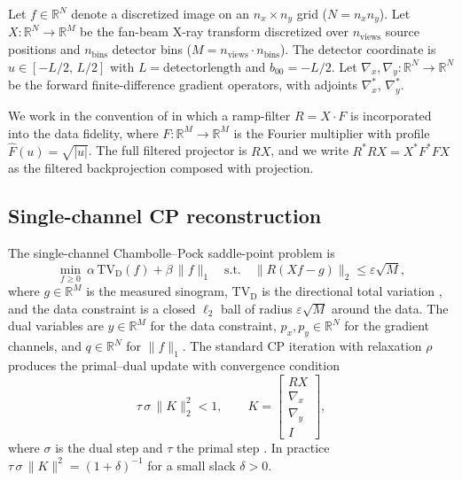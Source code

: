 \documentclass{article}
\newcommand{\R}{\mathbb{R}}
\newcommand{\eps}{\varepsilon}
\begin{document}
Let $f \in \R^{N}$ denote a discretized image on an $n_x \times n_y$
grid ($N = n_x n_y$). Let $X : \R^N \to \R^M$ be the fan-beam X-ray
transform discretized over $n_\text{views}$ source positions and
$n_\text{bins}$ detector bins ($M = n_\text{views} \cdot n_\text{bins}$).
The detector coordinate is $u \in [-L/2,\, L/2]$ with $L = \text{detectorlength}$
and $b_{00} = -L/2$. Let $\nabla_x, \nabla_y : \R^N \to \R^N$ be the
forward finite-difference gradient operators, with adjoints $\nabla_x^*$,
$\nabla_y^*$.

We work in the convention of \citet{sidky2014} in which a ramp-filter
$R = X \cdot F$ is incorporated into the data fidelity, where
$F : \R^M \to \R^M$ is the Fourier multiplier with profile
$\hat F(u) = \sqrt{|u|}$. The full filtered projector is $R X$, and we
write $R^* R X = X^* F^* F X$ as the filtered backprojection composed
with projection.

\subsection{Single-channel CP reconstruction}

The single-channel Chambolle--Pock saddle-point problem is
\begin{equation}\label{eq:cp-single}
  \min_{f \ge 0}\ \alpha\, \mathrm{TV}_\text{D}(f)
    + \beta\, \|f\|_1
    \quad \text{s.t.}\quad
    \|R(X f - g)\|_2 \le \eps \sqrt{M},
\end{equation}
where $g \in \R^M$ is the measured sinogram, $\mathrm{TV}_\text{D}$ is
the directional total variation \citep{rigie2015}, and the data
constraint is a closed $\ell_2$ ball of radius $\eps \sqrt{M}$ around
the data. The dual variables are $y \in \R^M$ for the data constraint,
$p_x, p_y \in \R^N$ for the gradient channels, and $q \in \R^N$ for
$\|f\|_1$. The standard CP iteration with relaxation $\rho$ produces
the primal--dual update with convergence condition
\begin{equation}\label{eq:cp-single-cond}
  \tau\, \sigma\, \|K\|_2^2 < 1,\qquad
  K = \begin{bmatrix} R X \\ \nabla_x \\ \nabla_y \\ I \end{bmatrix},
\end{equation}
where $\sigma$ is the dual step and $\tau$ the primal step
\citep{chambolle2011}. In practice $\tau\,\sigma\,\|K\|^2 = (1+\delta)^{-1}$
for a small slack $\delta > 0$.
\end{document}
